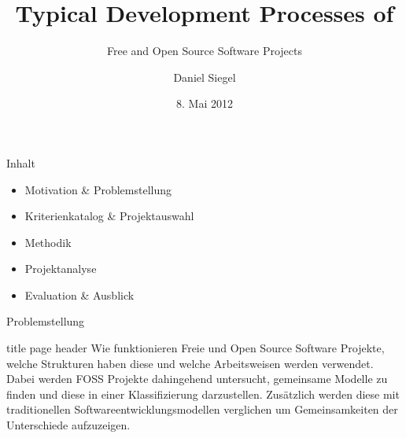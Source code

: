 \documentclass[11pt]{beamer}
\author{Daniel Siegel}
\title{Typical Development Processes of}%
\subtitle{Free and Open Source Software Projects}
\institute{Technische Universität München}
\date{8. Mai 2012}
\begin{document}
\begin{frame}[t,plain]
  \titlepage
\end{frame}

\begin{frame}[t]{Inhalt}
  \begin{itemize}
    \item Motivation \& Problemstellung
    \item Kriterienkatalog \& Projektauswahl
    \item Methodik
    \item Projektanalyse
    \item Evaluation \& Ausblick
  \end{itemize}
\end{frame}

\begin{frame}{Problemstellung}

\begin{beamercolorbox}[sep=1em]{title page header}
  Wie funktionieren Freie und Open Source Software Projekte, welche
  Strukturen haben diese und welche Arbeitsweisen werden verwendet. Dabei
  werden FOSS Projekte dahingehend untersucht, gemeinsame Modelle zu finden und
  diese in einer Klassifizierung darzustellen. Zusätzlich werden diese mit
  traditionellen Softwareentwicklungsmodellen verglichen um Gemeinsamkeiten
  der Unterschiede aufzuzeigen.
\end{beamercolorbox}
\end{frame}
\end{document}
